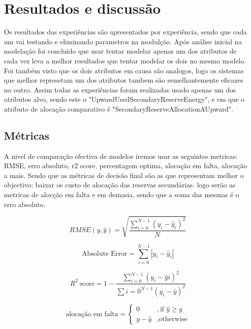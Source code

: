 \chapter{Resultados e discussão}

Os resultados das experiências são apresentados por experiência, sendo que cada um vai testando e eliminando parametros na modulção.
Após análise inicial na modelação foi concluido que usar tentar modelar apenas um dos atributos de cada vez leva a melhor resultados que tentar modelar os dois no mesmo modelo.
Foi também visto que os dois atributos em causa são analogos, logo os sistemas que melhor represetam um dos atributos tambem são semelhantemente eficazes no outro. 
Assim todas as experiências foram realizadas usado apenas um dos atributos alvo, sendo este o "UpwardUsedSecondaryReserveEnergy", e em que o atributo de alocação comparativo é  "SecondaryReserveAllocationAUpward".

\section{Métricas  \label{se:metricas}}

A nivel de comparação efectiva de modelos iremos usar as seguintes metricas: RMSE, erro absoluto, r2 score, percentagem optima, alocação em falta, alocação a mais.
Sendo que as métricas de decisão final são as que representam melhor o objectivo: baixar os custo de alocação das reservas secundárias. logo serão as metricas de alocção em falta e em demasia, sendo que a soma das mesmas é o erro absoluto.

\begin{equation}
\label{eq:rmse}
    RMSE (y, \hat{y}) = \sqrt{\frac{\sum_{i=0}^{N - 1} (y_i - \hat{y}_i)^2}{N}}
\end{equation}

\begin{equation} \label{eq:abse} 
    \text{Absolute\ Error} = \sum_{i=0}^{N - 1} \left| y_i - \hat{y}_i \right| 
\end{equation}

\begin{equation} \label{eq:r2score} R^2\ \text{score} = 1 - \frac{\sum_{i=0}^{N - 1} (y_i - \hat{y}i)^2}{\sum{i=0}^{N - 1} (y_i - \bar{y})^2} \end{equation}


\begin{equation} 
    \label{eq:eq1} 
    \text{alocação em falta} = 
    \begin{cases} 
        0 & ,\text{if } \hat{y} \geq y \\
        y - \hat{y} & ,\text{otherwise} 
    \end{cases} 
\end{equation}

